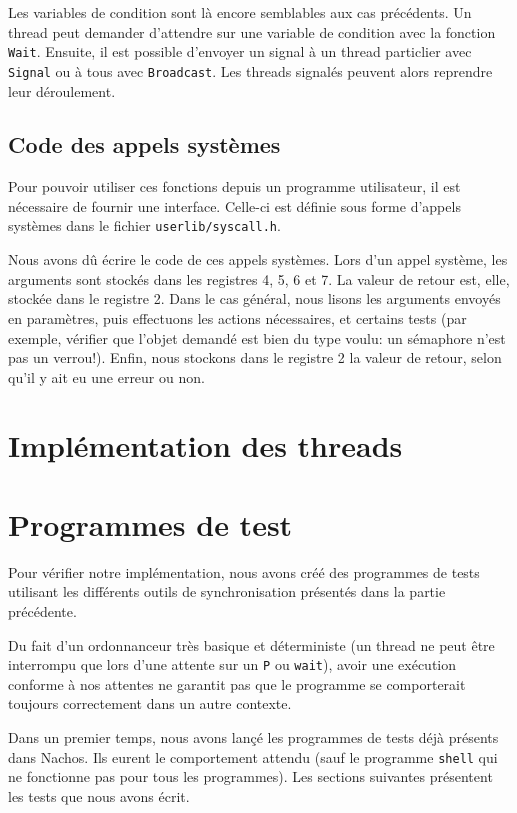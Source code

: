 \documentclass{article}
\def\file#1{\texttt{#1}}
\def\fun#1{\texttt{#1}}
\begin{document}
  Les variables de condition sont là encore semblables aux cas précédents. Un thread peut demander d'attendre sur une variable de condition avec la fonction \fun{Wait}. Ensuite, il est possible d'envoyer un signal à un thread particlier avec \fun{Signal} ou à tous avec \fun{Broadcast}. Les threads signalés peuvent alors reprendre leur déroulement.

\subsection{Code des appels systèmes}

  Pour pouvoir utiliser ces fonctions depuis un programme utilisateur, il est nécessaire de fournir une interface. Celle-ci est définie sous forme d'appels systèmes dans le fichier \file{userlib/syscall.h}.

  Nous avons dû écrire le code de ces appels systèmes. Lors d'un appel système, les arguments sont stockés dans les registres 4, 5, 6 et 7. La valeur de retour est, elle, stockée dans le registre 2.
  Dans le cas général, nous lisons les arguments envoyés en paramètres, puis effectuons les actions nécessaires, et certains tests (par exemple, vérifier que l'objet demandé est bien du type voulu: un sémaphore n'est pas un verrou!). Enfin, nous stockons dans le registre 2 la valeur de retour, selon qu'il y ait eu une erreur ou non.

\section{Implémentation des threads}

\section{Programmes de test}
Pour vérifier notre implémentation, nous avons créé des programmes de tests utilisant les différents outils de synchronisation présentés dans la partie précédente.

Du fait d'un ordonnanceur très basique et déterministe (un thread ne peut être interrompu que lors d'une attente sur un \fun{P} ou \fun{wait}), avoir une exécution conforme à nos attentes ne garantit pas que le programme se comporterait toujours correctement dans un autre contexte. 

Dans un premier temps, nous avons lançé les programmes de tests déjà présents dans Nachos. Ils eurent le comportement attendu (sauf le programme \texttt{shell} qui ne fonctionne pas pour tous les programmes). Les sections suivantes présentent les tests que nous avons écrit.
\end{document}

